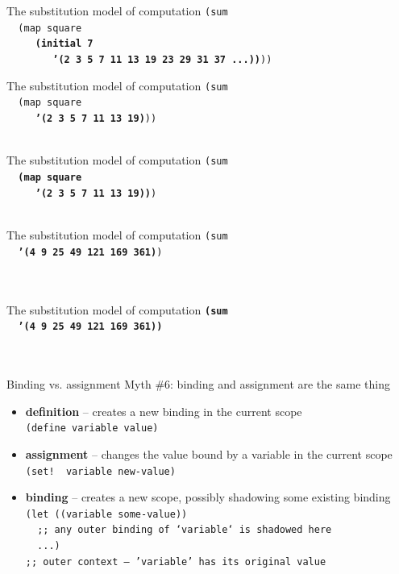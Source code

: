\documentclass{beamer}
\begin{document}
\begin{frame}{The substitution model of computation}
  \texttt{(sum \\
    \ \ (map square \\
    \ \ \ \ \ \textbf{(initial 7\\
    \ \ \ \ \ \ \ \ '(2 3 5 7 11 13 19 23 29 31 37 ...))}))}
\end{frame}

\begin{frame}{The substitution model of computation}
  \texttt{(sum \\
    \ \ (map square \\
    \ \ \ \ \ \textbf{'(2 3 5 7 11 13 19)}))\\
    \ }
\end{frame}

\begin{frame}{The substitution model of computation}
  \texttt{(sum \\
    \ \ \textbf{(map square \\
    \ \ \ \ \ '(2 3 5 7 11 13 19))})\\
    \ }
\end{frame}

\begin{frame}{The substitution model of computation}
  \texttt{(sum \\
    \ \ \textbf{'(4 9 25 49 121 169 361)})\\
    \ \\
    \ }
\end{frame}

\begin{frame}{The substitution model of computation}
  \texttt{\textbf{(sum \\
    \ \ '(4 9 25 49 121 169 361))}\\
    \ \\
    \ }
\end{frame}

\begin{frame}{Binding vs. assignment} \pause
  Myth \#6: binding and assignment are the same thing \\ \pause
  \begin{itemize}
  \item \textbf{definition} -- creates a new binding in the
    current scope \\ \pause
    \texttt{(define variable value)}\pause
  \item \textbf{assignment} -- changes the value bound by
    a variable in the current scope \\ \pause
    \texttt{(set!\,\,variable new-value)}
  \item \textbf{binding} -- creates a new scope,
    possibly shadowing some existing binding \\ \pause
    \texttt{(let ((variable some-value)) \\
      \ \ {\scriptsize ;; any outer binding of `variable` is shadowed here} \\
      \ \ ...) \\ \pause
      {\scriptsize ;; outer context -- 'variable' has its original value}
      }
  \end{itemize}
\end{frame}
\end{document}
